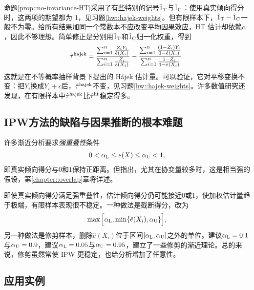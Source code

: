 命题\ref{prop::no-invariance-HT}采用了有些特别的记号$\hat{ 1 }_\textsc{T} $与$ \hat{ 1 }_\textsc{C}$：使用真实倾向得分时，这两项的期望都为 1，见习题\ref{hw::hajek-weights}。但有限样本下，$\hat{ 1 }_\textsc{T} - \hat{ 1 }_\textsc{C}$一般不为零。给所有结果加同一个常数本不应改变平均因果效应，HT 估计却依赖$c.$，因此不够理想。简单修正是分别用$\hat{ 1 }_\textsc{T}  $和$\hat{ 1 }_\textsc{C} $归一化权重，得到
$$
\hat{\tau}^\textup{hajek} = \frac{  \sum_{i=1}^n \frac{Z_i Y_i}{ \hat{e}(X_i) }  }{  \sum_{i=1}^n \frac{Z_i }{ \hat{e}(X_i) } }
- \frac{  \sum_{i=1}^n \frac{ (1-Z_i) Y_i}{ 1 - \hat{e}(X_i) }  }{  \sum_{i=1}^n \frac{ 1-Z_i}{ 1 - \hat{e}(X_i) }  }.
$$
这就是\citet{hajek1971comment}在不等概率抽样背景下提出的 Hájek 估计量。可以验证，它对平移变换不变：把$Y_i$换成$Y_i + c$后，$\hat{\tau}^\textup{hajek}$不变，见习题\ref{hw::hajek-weights}。许多数值研究还发现，在有限样本中$\hat{\tau}^\textup{hajek}$比$\hat{\tau}^\textup{ht}$稳定得多。 





\subsection{IPW方法的缺陷与因果推断的根本难题}
\label{sec::ipw-problem}


许多渐近分析要求{\it 强重叠性}条件
$$
0<  \alpha_\textsc{L} \leq e(X) \leq  \alpha_\textsc{U} < 1,
$$
即真实倾向得分与$0$和$1$保持正距离。但\citet{d2017overlap}指出，尤其在协变量较多时，这是相当强的假设，第\ref{chapter::overlap}章将详述。 


即使真实倾向得分满足强重叠性，估计倾向得分仍可能接近$0$或$1$，使加权估计量趋于极端，有限样本表现很不稳定。一种做法是截断得分，改为
$$
 \max\Big[  \alpha_\textsc{L},   \min\{   \hat{e}(X_i), \alpha_\textsc{U} \}   \Big] ,
$$
另一种做法是修剪样本，删除$\hat{e}(X_i)$位于区间$[\alpha_\textsc{L},   \alpha_\textsc{U}  ]$之外的单位。\citet{crump2009dealing}建议$  \alpha_\textsc{L} = 0.1$与$\alpha_\textsc{U} = 0.9 $，\citet{kurth2005results}建议$  \alpha_\textsc{L} = 0.05$与$\alpha_\textsc{U} = 0.95 $，\citet{yang2018asymptotic}建立了一些修剪的渐近理论。总的来说，修剪虽然常使 IPW 更稳定，也给分析增加了任意性。 




 \subsection{应用实例}\label{sec::application-pscore-weighting}


